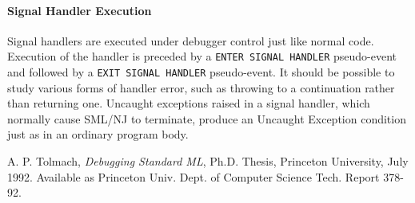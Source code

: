 \paragraph{Signal Handler Execution}
Signal handlers are executed under debugger control just like normal code.
Execution of the handler is preceded by a {\tt ENTER SIGNAL HANDLER}
pseudo-event and followed by a {\tt EXIT SIGNAL HANDLER} pseudo-event.
It should be possible to study various forms of handler error, such
as throwing to a continuation rather than returning one.
Uncaught exceptions raised in a signal handler, which normally cause
SML/NJ to terminate, produce an Uncaught Exception condition just as in
an ordinary program body.  

\begin{thebibliography}{9}
 A. P. Tolmach, {\em Debugging Standard ML}, Ph.D. Thesis,
Princeton University, July 1992.  Available as Princeton Univ. Dept.
of Computer Science Tech. Report 378-92.
\end{thebibliography}


